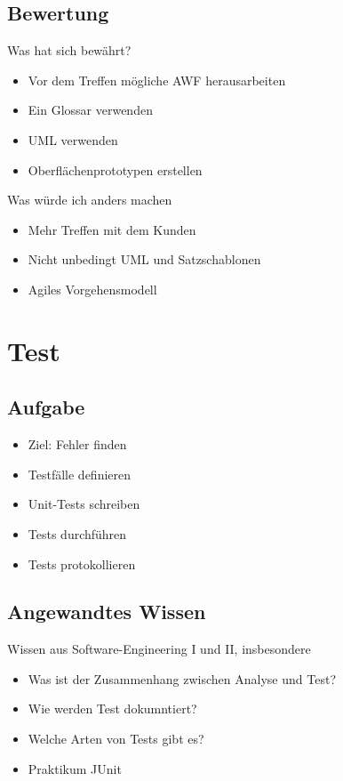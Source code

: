 \documentclass{beamer}
\begin{document}
  \subsection{Bewertung}
  \begin{frame}{\subsecname}
    \begin{block}{Was hat sich bewährt?}
      \begin{itemize}
        \item Vor dem Treffen mögliche AWF herausarbeiten
        \item Ein Glossar verwenden
        \item UML verwenden
        \item Oberflächenprototypen erstellen
      \end{itemize}
    \end{block}

    \begin{block}{Was würde ich anders machen}
      \begin{itemize}
        \item Mehr Treffen mit dem Kunden
        \item Nicht unbedingt UML und Satzschablonen
        \item Agiles Vorgehensmodell
      \end{itemize}
    \end{block}
  \end{frame}


  \section{Test}
  \subsection{Aufgabe}
  \begin{frame}{\subsecname}
    \begin{itemize}
      \item Ziel: Fehler finden
      \item Testfälle definieren
      \item Unit-Tests schreiben
      \item Tests durchführen
      \item Tests protokollieren
    \end{itemize}
  \end{frame}

  \subsection{Angewandtes Wissen}
  \begin{frame}{\subsecname}
    Wissen aus Software-Engineering I und II, insbesondere
    \begin{itemize}
      \item Was ist der Zusammenhang zwischen Analyse und Test?
      \item Wie werden Test dokumntiert?
      \item Welche Arten von Tests gibt es?
      \item Praktikum JUnit
    \end{itemize}
  \end{frame}
\end{document}
